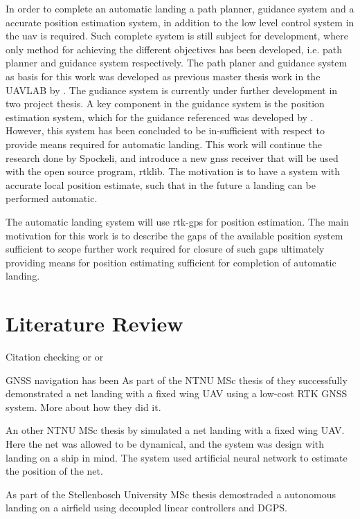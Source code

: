 In order to complete an automatic landing a path planner, guidance system and a accurate position estimation system, in addition to the low level control system in the \gls{uav} is required. Such complete system is still subject for development, where only method for achieving the different objectives has been developed, i.e. path planner and guidance system respectively. The path planer and guidance system as basis for this work was developed as previous master thesis work in the UAVLAB by \citep{Froelich}. The gudiance system is currently under further development in two project thesis. A key component in the guidance system is the position estimation system, which for the guidance referenced was developed by \citep{Spockeli}. However, this system has been concluded to be in-sufficient with respect to provide means required for automatic landing. This work will continue the research done by Spockeli, and introduce a new \gls{gnss} receiver that will be used with the open source program, rtklib. The motivation is to have a system with accurate local position estimate, such that in the future a landing can be performed automatic.

The automatic landing system will use \gls{rtk-gps} for position estimation. The main motivation for this work is to describe the gaps of the available position system sufficient to scope further work required for closure of such gaps ultimately providing means for position estimating sufficient for completion of automatic landing.
\section{Literature Review}
Citation checking \citep{Spockeli,Froelich} or \cite{Spockeli,Froelich} or \citet{Spockeli,Froelich}

GNSS navigation has been
As part of the NTNU MSc thesis of \citep{Skulstad&Syversen} they successfully demonstrated a net landing with a fixed wing UAV using a low-cost RTK GNSS system. More about how they did it.

An other NTNU MSc thesis by \citep{Spockeli} simulated a net landing with a fixed wing UAV. Here the net was allowed to be dynamical, and the system was design with landing on a ship in mind. The system used artificial neural network to estimate the position of the net.

As part of the Stellenbosch University MSc thesis \citep{smit2013autonomous} demostraded a autonomous landing on a airfield using decoupled linear controllers and DGPS. 

